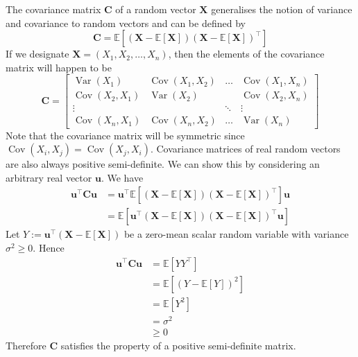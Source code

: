 \documentclass[11pt]{report} %
\begin{document}
The covariance matrix $\mathbf{C}$ of a random vector $\mathbf{X}$ generalises the notion of variance and covariance to random vectors and can be defined by
\begin{equation}
\mathbf{C} = \mathbb{E}\left[\left(\mathbf{X} - \mathbb{E}\left[\mathbf{X}\right]\right)\left(\mathbf{X} - \mathbb{E}\left[\mathbf{X}\right]\right)^{\top}\right]
\end{equation}
If we designate $\mathbf{X} = \left(X_{1}, X_{2}, \dots, X_{n}\right)$, then the elements of the covariance matrix will happen to be
\begin{equation}
\mathbf{C} = \begin{bmatrix}\operatorname{Var}\left(X_{1}\right) & \operatorname{Cov}\left(X_{1},X_{2}\right) & \dots & \operatorname{Cov}\left(X_{1},X_{n}\right)\\
\operatorname{Cov}\left(X_{2},X_{1}\right) & \operatorname{Var}\left(X_{2}\right) &  & \operatorname{Cov}\left(X_{2},X_{n}\right)\\
\vdots &  & \ddots & \vdots\\
\operatorname{Cov}\left(X_{n},X_{1}\right) & \operatorname{Cov}\left(X_{n},X_{2}\right) & \dots & \operatorname{Var}\left(X_{n}\right)
\end{bmatrix}
\end{equation}
Note that the covariance matrix will be symmetric since $\operatorname{Cov}\left(X_{i},X_{j}\right) = \operatorname{Cov}\left(X_{j},X_{i}\right)$. Covariance matrices of real random vectors are also always positive semi-definite. We can show this by considering an arbitrary real vector $\mathbf{u}$. We have
\begin{align}
\mathbf{u}^{\top}\mathbf{C}\mathbf{u} &= \mathbf{u}^{\top}\mathbb{E}\left[\left(\mathbf{X} - \mathbb{E}\left[\mathbf{X}\right]\right)\left(\mathbf{X} - \mathbb{E}\left[\mathbf{X}\right]\right)^{\top}\right]\mathbf{u} \\
&= \mathbb{E}\left[\mathbf{u}^{\top}\left(\mathbf{X} - \mathbb{E}\left[\mathbf{X}\right]\right)\left(\mathbf{X} - \mathbb{E}\left[\mathbf{X}\right]\right)^{\top}\mathbf{u}\right]
\end{align}
Let $Y := \mathbf{u}^{\top}\left(\mathbf{X} - \mathbb{E}\left[\mathbf{X}\right]\right)$ be a zero-mean scalar random variable with variance $\sigma^{2} \geq 0$. Hence
\begin{align}
\mathbf{u}^{\top}\mathbf{C}\mathbf{u} &= \mathbb{E}\left[YY^{\top}\right] \\
&= \mathbb{E}\left[\left(Y - \mathbb{E}\left[Y\right]\right)^{2}\right] \\
&= \mathbb{E}\left[Y^{2}\right] \\
&= \sigma^{2} \\
&\geq 0
\end{align}
Therefore $\mathbf{C}$ satisfies the property of a positive semi-definite matrix.
\end{document}
